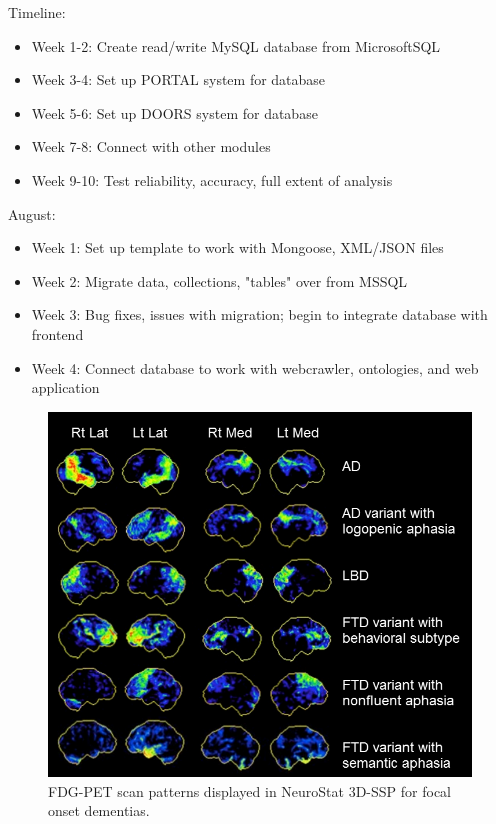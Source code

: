 \documentclass[10pt,twocolumn,twoside]{article}
\begin{document}
Timeline:
\begin{itemize}
	\item Week 1-2: Create read/write MySQL database from MicrosoftSQL
	\item Week 3-4: Set up PORTAL system for database
	\item Week 5-6: Set up DOORS system for database
	\item Week 7-8: Connect with other modules 
	\item Week 9-10: Test reliability, accuracy, full extent of analysis
\end{itemize}

August:
\begin{itemize}
	\item Week 1: Set up template to work with Mongoose, XML/JSON files
	\item Week 2: Migrate data, collections, "tables" over from MSSQL
	\item Week 3: Bug fixes, issues with migration; begin to integrate database with frontend
	\item Week 4: Connect database to work with webcrawler, ontologies, and web application
\end{itemize}
	
\begin{figure}[ht]
{\centering
\includegraphics[width=6.5in]{FDGPETFOD_patterns_ctrev3.png}
\caption{FDG-PET scan patterns displayed in NeuroStat 3D-SSP for focal onset dementias.}
\label{figADPatterns} }
\end{figure}
\end{document}
